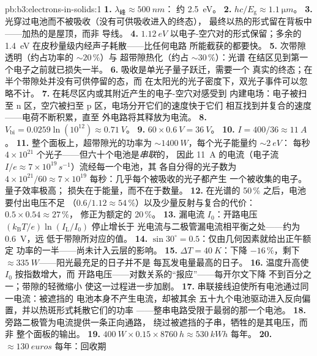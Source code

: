 \begin{solution}{pb:b3:electrons-in-solids:1}
\textbf{1.} $\lambda_{\text{峰}} \approx \qty{500}{nm}$：
约 \qty{2.5}{eV}。
\textbf{2.} $hc/E_{\text{g}} \approx \qty{1.1}{\micro m}$。
\textbf{3.} 光穿过电池而不被吸收（没有可供吸收进入的终态），
最终以热的形式留在背板中——加热的是屋顶，而非
导线。
\textbf{4.} $\qty{1.12}{eV}$ 以电子-空穴对的形式保留；多余的
\qty{1.4}{eV} 在皮秒量级内经声子耗散——比任何电路
所能截获的都要快。
\textbf{5.} 次带隙透明（约占功率的 $\sim20\,\%$）与
超带隙热化（约占 $\sim30\,\%$）：光谱
在结区见到第一个电子之前就已损失一半。
\textbf{6.} 吸收是单光子量子跃迁，需要一个
真实的终态；在半个带隙处并没有可供停留的态，而
在太阳光的光子密度下，双光子事件可以忽略不计。
\textbf{7.} 在耗尽区内或其附近产生的电子-空穴对感受到
内建电场：电子被扫至 n 区，空穴被扫至
p 区，电场分开它们的速度快于它们
相互找到并复合的速度——电荷不断积累，直至
外电路将其释放为电流。
\textbf{8.} $V_{\text{bi}} = 0.0259\ln(10^{12}) \approx
\qty{0.71}{V}$。
\textbf{9.} $60\times\qty{0.6}{V} = \qty{36}{V}$。
\textbf{10.} $I = 400/36 \approx \qty{11}{A}$。
\textbf{11.} 整个面板上，超带隙光的功率为
$\sim\qty{1400}{W}$，每个光子能量约 $\sim\qty{2}{eV}$：
每秒 $4\times10^{21}$ 个光子——但六十个电池是\emph{串联}的，
因此 \qty{11}{A} 的电流（电子流 $I/e \approx
7\times10^{19}\,\unit{s^{-1}}$）流经每一个电池，其
各自分得的光子数为 $4\times10^{21}/60 \approx
7\times10^{19}$ 每秒：几乎每个被吸收的光子都产生
一个被收集的电子。量子效率极高；
损失在于能量，而不在于数量。
\textbf{12.} 在光谱的 50\,\% 之后，电池要付出电压不足
（$0.6/1.12 \approx 54\,\%$）以及少量反射与复合的代价：
$0.5\times0.54 \approx 27\,\%$，
修正为额定的 20\,\%。
\textbf{13.} 漏电流 $I_0$：开路电压
$(k_{\text{B}}T/e)\ln(I_{\text{L}}/I_0)$ 停止增长于
光电流与二极管漏电流相平衡之处——约为 \qty{0.6}{V}，远
低于带隙所对应的值。
\textbf{14.} $\sin30^\circ = 0.5$：仅由几何因素就给出正午额定
功率的一半——尚未计入云层的影响。
\textbf{15.} $\Delta T = \qty{40}{K}$：下降 $-16\,\%$，剩下
$\approx\qty{335}{W}$——阳光最充足的日子并不是
每瓦发电量最高的日子。
\textbf{16.} 温度升高使 $I_0$ 按指数增大，而
开路电压——对数关系的“报应”——每开尔文下降
不到百分之一；带隙的轻微缩小
使这一过程进一步加剧。
\textbf{17.} 串联接线迫使所有电池通过同一电流：被遮挡的
电池本身不产生电流，却被其余
五十九个电池驱动进入反向偏置，并以热斑形式耗散它们的功率
——整串电路受限于最弱的那一个电池。
\textbf{18.} 旁路二极管为电流提供一条正向通路，
绕过被遮挡的子串，牺牲的是其电压，而非
整个面板的输出。
\textbf{19.} $\qty{400}{W}\times0.15\times\qty{8760}{h} \approx
\qty{530}{kWh}$ 每年。
\textbf{20.} $\approx\qty{130}{euros}$ 每年：回收期

\end{solution}
